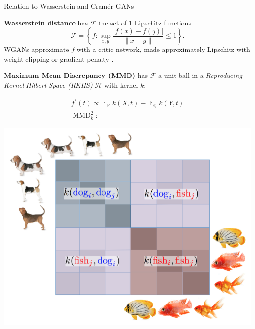 \documentclass[xcolor={table}]{beamer}
\DeclareMathOperator*{\E}{\mathbb{E}}
\newcommand{\F}{\mathcal{F}}
\newcommand{\h}{\mathcal{H}}
\newcommand{\PP}{\mathbb P}
\newcommand{\QQ}{\mathbb Q}
\DeclareMathOperator{\mmd}{MMD}
\begin{document}
\begin{frame}{}
\begin{columns}[T, totalwidth=\textwidth]
\begin{column}{.32\textwidth}
\begin{block}{Relation to Wasserstein and Cram\'er GANs}
      \vspace*{-1.5ex}\begin{itemize}
        \item{\textbf{Wasserstein distance} has $\F$ the set of 1-Lipschitz functions
          \[
            \F = \left\{f: \sup_{x,y} \frac{|f(x) - f(y)|}{\|x - y\|}\leq 1\right\}.
          \]
          WGANs approximate $f$ with a critic network,
          made approximately Lipschitz with
          weight clipping \parencite{wgan}
          or gradient penalty \parencite{wgan-gp}.
        \item \textbf{Maximum Mean Discrepancy (MMD)} %
          has $\F$ a unit ball in a
          \emph{Reproducing Kernel Hilbert Space (RKHS)} $\h$ with kernel $k$: %
          \begin{minipage}{.49\linewidth}
            \begin{gather*}
              f^*(t) \propto \E_{\PP}k(X, t) - \E_{\QQ}k(Y, t)
              \\
              \mmd_k^2:
            \end{gather*}
          \end{minipage}
          \begin{minipage}{.49\linewidth}
          \includegraphics[width=\linewidth]{figs/dogfish.png}
          \end{minipage}
}
\end{itemize}
\end{block}
\end{column}
\end{columns}
\end{frame}
\end{document}
